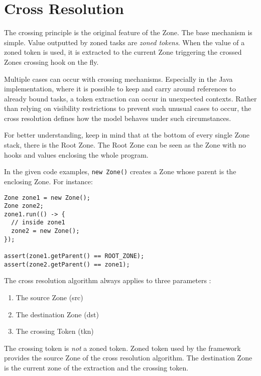 \section{Cross Resolution}

The crossing principle is the original feature of the Zone. The base mechanism is simple. Value outputted by zoned tasks are \emph{zoned tokens}. When the value of a zoned token is used, it is extracted to the current Zone triggering the crossed Zones crossing hook on the fly.

Multiple cases can occur with crossing mechanisms. Especially in the Java implementation, where it is possible to keep and carry around references to already bound tasks, a token extraction can occur in unexpected contexts. Rather than relying on visibility restrictions to prevent such unusual cases to occur, the cross resolution defines how the model behaves under such circumstances.

For better understanding, keep in mind that at the bottom of every single Zone stack, there is the Root Zone. The Root Zone can be seen as the Zone with no hooks and values enclosing the whole program.

In the given code examples, \lstinline{new Zone()} creates a Zone whose parent is the enclosing Zone. For instance:

\begin{lstlisting}
Zone zone1 = new Zone();
Zone zone2;
zone1.run(() -> {
  // inside zone1
  zone2 = new Zone();
});

assert(zone1.getParent() == ROOT_ZONE);
assert(zone2.getParent() == zone1);
\end{lstlisting}

The cross resolution algorithm always applies to three parameters :

\begin{enumerate}
\item The source Zone (src)
\item The destination Zone (dst)
\item The crossing Token (tkn)
\end{enumerate}

The crossing token is \emph{not} a zoned token. Zoned token used by the framework provides the source Zone of the cross resolution algorithm. The destination Zone is the current zone of the extraction and the crossing token.

